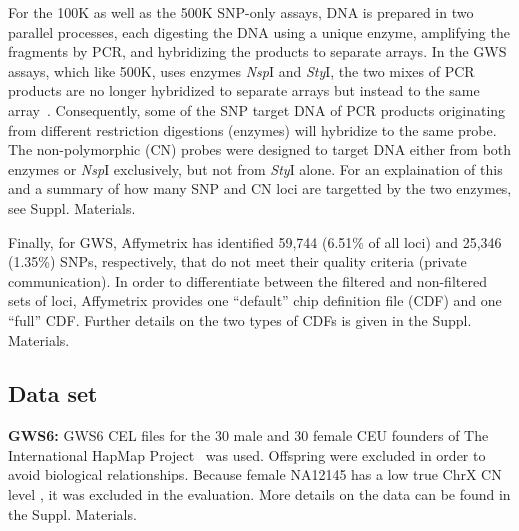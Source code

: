 \documentclass{bioinfo}
\newcommand{\GWS}{GWS\xspace}
\newcommand{\GWSFive}{GWS5\xspace}
\newcommand{\GWSSix}{GWS6\xspace}
\newcommand{\chrX}{ChrX\xspace}
\newcommand{\NspI}{\emph{Nsp}I\xspace}
\newcommand{\StyI}{\emph{Sty}I\xspace}
\begin{document}
For the 100K as well as the 500K SNP-only assays, DNA is prepared in two parallel processes, each digesting the DNA using a unique enzyme, amplifying the fragments by PCR, and hybridizing the products to separate arrays.  In the GWS assays, which like 500K, uses enzymes \NspI and \StyI, the two mixes of PCR products are no longer hybridized to separate arrays but instead to the same array~\citep{Affymetrix_2007f, Affymetrix_2007g}.
Consequently, some of the SNP target DNA of PCR products originating from different restriction digestions (enzymes) will hybridize to the same probe.  
The non-polymorphic (CN) probes were designed to target DNA either from both enzymes or \NspI exclusively, but not from \StyI alone.  
For an explaination of this and a summary of how many SNP and CN loci are targetted by the two enzymes, see Suppl. Materials.


Finally, for \GWS, Affymetrix has identified 59,744 (6.51\% of all loci) and 25,346 (1.35\%) SNPs, respectively, that do not meet their quality criteria (private communication).
In order to differentiate between the filtered and non-filtered sets of loci, Affymetrix provides one ``default'' chip definition file (CDF) and one ``full'' CDF.  Further details on the two types of CDFs is given in the Suppl. Materials.






\subsection{Data set}
\textbf{\GWSSix:} \GWSSix CEL files for the 30 male and 30 female CEU founders of The International HapMap Project~\citep{HapMap_2003, AltshulerD_etal_2005} was used. Offspring were excluded in order to avoid biological relationships.
Because female NA12145 has a low true \chrX CN level \citep{TingJ_etal_2006}, it was excluded in the evaluation.  
More details on the data can be found in the Suppl. Materials.
\end{document}
